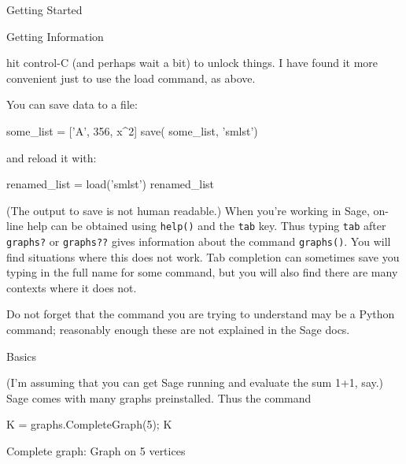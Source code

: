 \begin{chap}{Getting Started}
\begin{sect}{Getting Information}
\begin{para}
hit control-C (and perhaps wait a bit) to unlock things.  I have found it more
convenient just to use the load command, as above.
\end{para}
%
\begin{para}
You can save data to a file:
\end{para}
%
\begin{sagecode}
\begin{sageinput}
some_list = ['A', 356, x^2]
save( some_list, 'smlst')
\end{sageinput}
\end{sagecode}
%
\begin{para}
and reload it with: 
\end{para}
%
\begin{sagecode}
\begin{sageinput}
renamed_list = load('smlst')
renamed_list
\end{sageinput}
\begin{sageoutput}
['A', 356, x^2]
\end{sageoutput}
\end{sagecode}
%
\begin{para}
(The output to save is not human readable.)             
When you're working in Sage, on-line help can be obtained using \texttt{help()} 
and the \texttt{tab} key. Thus typing \texttt{tab} after \texttt{graphs?} or \texttt{graphs??} gives 
information about the command \texttt{graphs()}.  You will find situations where this
does not work.  Tab completion can sometimes save you typing in the full name for
some command, but you will also find there are many contexts where it does not.
\end{para}
%
\begin{para}
Do not forget that the command you are trying to understand may be a Python
command; reasonably enough these are not explained in the Sage docs.
\end{para}
%
\end{sect}
%
\begin{sect}{Basics}
%
\begin{para}
(I'm assuming that you can get Sage running and evaluate the sum 1+1, say.)
Sage comes with many graphs preinstalled.  Thus the command
\end{para}
%
%
\begin{sagecode}
\begin{sageinput}
K = graphs.CompleteGraph(5); K
\end{sageinput}
\begin{sageoutput}
Complete graph: Graph on 5 vertices

\end{sageoutput}
\end{sagecode}
\end{sect}
\end{chap}
